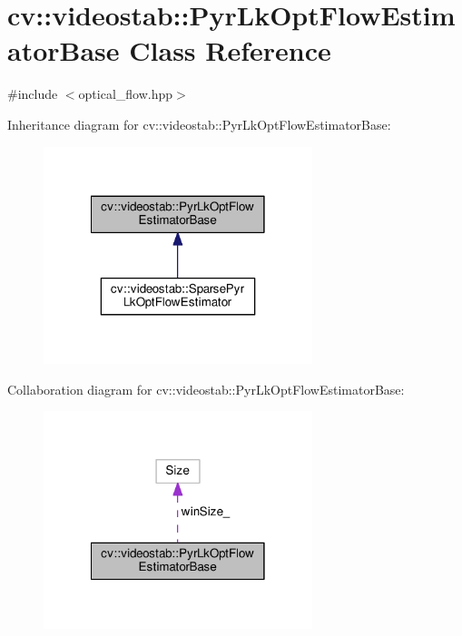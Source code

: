 \hypertarget{classcv_1_1videostab_1_1PyrLkOptFlowEstimatorBase}{\section{cv\-:\-:videostab\-:\-:Pyr\-Lk\-Opt\-Flow\-Estimator\-Base Class Reference}
\label{classcv_1_1videostab_1_1PyrLkOptFlowEstimatorBase}
}


{\ttfamily \#include $<$optical\-\_\-flow.\-hpp$>$}



Inheritance diagram for cv\-:\-:videostab\-:\-:Pyr\-Lk\-Opt\-Flow\-Estimator\-Base\-:\nopagebreak
\begin{figure}[H]
\begin{center}
\leavevmode
\includegraphics[width=222pt]{classcv_1_1videostab_1_1PyrLkOptFlowEstimatorBase__inherit__graph}
\end{center}
\end{figure}


Collaboration diagram for cv\-:\-:videostab\-:\-:Pyr\-Lk\-Opt\-Flow\-Estimator\-Base\-:\nopagebreak
\begin{figure}[H]
\begin{center}
\leavevmode
\includegraphics[width=222pt]{classcv_1_1videostab_1_1PyrLkOptFlowEstimatorBase__coll__graph}
\end{center}
\end{figure}
